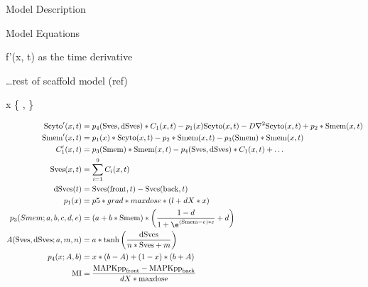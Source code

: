 \documentclass{article}
\begin{document}
Model Description

Model Equations

f'(x, t) as the time derivative

\dots rest of scaffold model (ref)

x \in \{  ,  \}

\[\begin{align}
    \text{Scyto}'(x,t)      & = p_4(\text{Sves}, \text{dSves}) * C_1(x,t)    - p_1(x) \text{Scyto}(x,t) - D \nabla^2 \text{Scyto}(x,t)+p_2 * \text{Smem}(x,t) \\
    \text{Smem}'(x,t)       & = p_1(x) * \text{Scyto}(x,t) - p_2 * \text{Smem}(x,t) - p_3(\text{Smem}) * \text{Smem}(x,t)                                     \\
    C_1'(x,t)               & = p_3(\text{Smem}) * \text{Smem}(x,t)  - p_4(\text{Sves}, \text{dSves}) * C_1(x,t) + \dots                                      \\
    \text{Sves}(x,t)               & = \sum_{i=1}^{9}C_i(x,t)                                                                                                        \\
    \text{dSves}(t)                & = \text{Sves}(\text{front},t) - \text{Sves}(\text{back},t)                                                                                           \\
    p_1(x)                  & = p5 * grad * maxdose * (l + dX * x)                                                                                            \\
    p_3(Smem; a,b,c,d,e)    & = (a + b * \text{Smem}) * \left( \frac{ 1-d }{ 1 + \e^{ (\text{Smem} - e) * c}  } + d \right)                                   \\
    A(\text{Sves}, \text{dSves}; a, m, n) & = a * \tanh \left ( \frac{\text{dSves}}{n * \text{Sves} + m} \right )                                                                         \\
    p_4(x; A, b)            & = x * (b-A) + (1-x) * (b+A)                                                                                                     \\
    \text{MI}               & = \frac{  \text{MAPKpp}_{\text{front}}
                                      - \text{MAPKpp}_{\text{back}} }
                                     { dX * \text{maxdose} } 
\end{align}

\]
\end{document}
